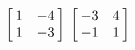 {$\left[\hskip -3pt \begin{array}{cc} 1&-4\\  1&-3\end {array} \hskip -3pt
 \right]$ 
 }
{$\left[\hskip -3pt \begin{array}{cc} -3&4\\  -1&1\end {array} \hskip -3pt
 \right]$ }
